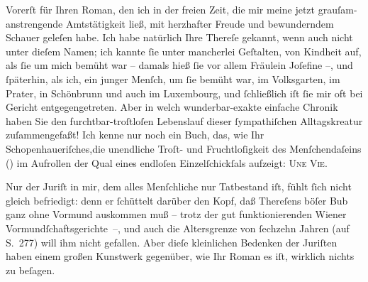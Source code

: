 \pstart
           Vorerſt für Ihren Roman, den
               ich in der freien Zeit, die mir meine jetzt grauſam-anstrengende Amtstätigkeit ließ,
               mit herzhafter Freude und bewunderndem Schauer geleſen habe. {\pb}Ich habe natürlich Ihre Thereſe gekannt,
               wenn auch nicht unter dieſem Namen; ich kannte ſie unter mancherlei Geſtalten, von
               Kindheit auf, als ſie um mich bemüht war – damals hieß ſie vor allem Fräulein
               Joſefine –, und ſpäterhin, als ich, ein junger Menſch, um ſie bemüht war, im Volksgarten, im Prater, in Schönbrunn und auch im Luxembourg, und ſchließlich iſt ſie mir oft bei
               Gericht entgegengetreten. Aber in welch wunderbar-exakte einfache Chronik haben Sie
               den furchtbar-troſtloſen Lebenslauf dieser ſympathiſchen Alltagskreatur
               zuſammengefaßt! Ich kenne nur noch ein Buch, das, wie Ihr Schopenhaueriſches,die unendliche Troſt- und Fruchtloſigkeit
               des Menſchendaſeins (\textsc{\label{K_L02500-1v}\label{K_L02500-1}}) im Aufrollen der Qual eines endloſen Einzelſchickſals aufzeigt: \textsc{Une Vie}.\pend
           
\pstart
           {\pb}Nur der Juriſt in mir, dem alles
               Menſchliche nur Tatbestand iſt, fühlt ſich nicht gleich befriedigt: denn er ſchüttelt
               darüber den Kopf, daß Thereſens böſer Bub ganz ohne Vormund auskommen muß – trotz der gut
               funktionierenden Wiener Vormundſchaftsgerichte –,
               und auch die Altersgrenze von ſechzehn Jahren (auf S. 277) will ihm nicht gefallen.
               Aber dieſe kleinlichen Bedenken der Juriſten haben einem großen Kunstwerk gegenüber,
               wie Ihr Roman es iſt, wirklich
               nichts zu beſagen.\pend
           
